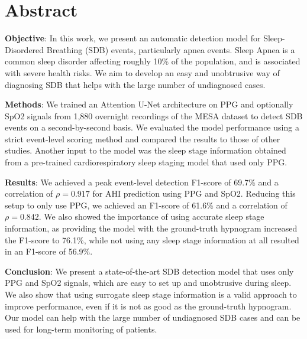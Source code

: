 \chapter*{Abstract}

\textbf{Objective}: In this work, we present an automatic detection model for Sleep-Disordered Breathing (SDB) events, particularly apnea events. Sleep Apnea is a common sleep disorder affecting roughly 10\% of the population, and is associated with severe health risks. We aim to develop an easy and unobtrusive way of diagnosing SDB that helps with the large number of undiagnosed cases.

\noindent\textbf{Methods}: We trained an Attention U-Net architecture on PPG and optionally SpO2 signals from 1,880 overnight recordings of the MESA dataset to detect SDB events on a second-by-second basis. We evaluated the model performance using a strict event-level scoring method and compared the results to those of other studies. Another input to the model was the sleep stage information obtained from a pre-trained cardiorespiratory sleep staging model that used only PPG.

\noindent\textbf{Results}: We achieved a peak event-level detection F1-score of 69.7\% and a correlation of $\rho = 0.917$ for AHI prediction using PPG and SpO2. Reducing this setup to only use PPG, we achieved an F1-score of 61.6\% and a correlation of $\rho = 0.842$. We also showed the importance of using accurate sleep stage information, as providing the model with the ground-truth hypnogram increased the F1-score to 76.1\%, while not using any sleep stage information at all resulted in an F1-score of 56.9\%.

\noindent\textbf{Conclusion}: We present a state-of-the-art SDB detection model that uses only PPG and SpO2 signals, which are easy to set up and unobtrusive during sleep. We also show that using surrogate sleep stage information is a valid approach to improve performance, even if it is not as good as the ground-truth hypnogram. Our model can help with the large number of undiagnosed SDB cases and can be used for long-term monitoring of patients.